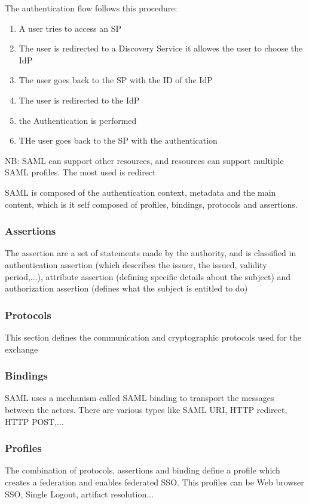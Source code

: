 \documentclass[12pt, a4paper]{article}
\begin{document}
The authentication flow follows this procedure:
\begin{enumerate}
    \item A user tries to access an SP
    \item The user is redirected to a Discovery Service
    \subitem it allowes the user to choose the IdP
    \item The user goes back to the SP with the ID of the IdP
    \item The user is redirected to the IdP
    \item the Authentication is performed
    \item THe user goes back to the SP with the authentication
\end{enumerate}

NB: SAML can support other resources, and resources can support multiple SAML profiles. The most used is 
redirect

SAML is composed of the authentication context, metadata and the main content, which is it self composed 
of profiles, bindings, protocols and assertions.

\subsubsection*{Assertions}
The assertion are a set of statements made by the authority,
and is classified in authentication assertion (which describes the issuer, the issued, validity period,...), 
attribute assertion (defining specific details about the subject) and authorization assertion (defines what the
subject is entitled to do)

\subsubsection*{Protocols}
This section defines the communication and cryptographic protocols used for the exchange

\subsubsection*{Bindings}
SAML uses a mechanism called SAML binding to transport the messages between the actors. There are various types 
like SAML URI, HTTP redirect, HTTP POST,...

\subsubsection*{Profiles}
The combination of protocols, assertions and binding define a profile which creates a federation and enables 
federated SSO. This profiles can be Web browser SSO, Single Logout, artifact resolution...
\end{document}
